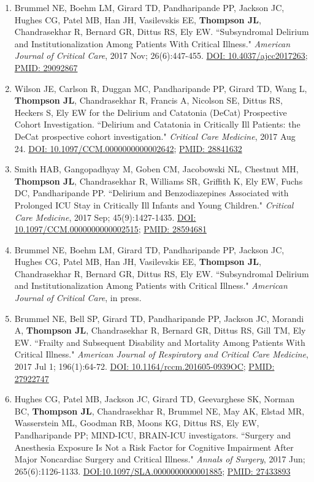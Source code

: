 \documentclass[5pt]{article}
\begin{document}
\begin{enumerate}
\item Brummel NE, Boehm LM, Girard TD, Pandharipande PP, Jackson JC, Hughes CG, Patel MB, Han JH, Vasilevskis EE, \textbf{Thompson JL}, Chandrasekhar R, Bernard GR, Dittus RS, Ely EW. ``Subsyndromal Delirium and Institutionalization Among Patients With Critical Illness." \emph{American Journal of Critical Care}, 2017 Nov; 26(6):447-455. \href{https://doi.org/10.4037/ajcc2017263}{DOI: 10.4037/ajcc2017263}; \href{https://www.ncbi.nlm.nih.gov/pubmed/29092867}{PMID: 29092867}
\item Wilson JE, Carlson R, Duggan MC, Pandharipande PP, Girard TD, Wang L, \textbf{Thompson JL}, Chandrasekhar R, Francis A, Nicolson SE, Dittus RS, Heckers S, Ely EW for the Delirium and Catatonia (DeCat) Prospective Cohort Investigation. ``Delirium and Catatonia in Critically Ill Patients: the DeCat prospective cohort investigation." \emph{Critical Care Medicine}, 2017 Aug 24. \href{https://insights.ovid.com/crossref?an=00003246-900000000-96519}{DOI: 10.1097/CCM.0000000000002642}; \href{https://www.ncbi.nlm.nih.gov/pubmed/28841632}{PMID: 28841632}
\item Smith HAB, Gangopadhyay M, Goben CM, Jacobowski NL, Chestnut MH, \textbf{Thompson JL}, Chandrasekhar R, Williams SR, Griffith K, Ely EW, Fuchs DC, Pandharipande PP. ``Delirium and Benzodiazepines Associated with Prolonged ICU Stay in Critically Ill Infants and Young Children." \emph{Critical Care Medicine}, 2017 Sep; 45(9):1427-1435. \href{https://insights.ovid.com/crossref?an=00003246-900000000-96586}{DOI: 10.1097/CCM.0000000000002515}; \href{https://www.ncbi.nlm.nih.gov/pubmed/28594681}{PMID: 28594681}
\item Brummel NE, Boehm LM, Girard TD, Pandharipande PP, Jackson JC, Hughes CG, Patel MB, Han JH, Vasilevskis EE, \textbf{Thompson JL}, Chandrasekhar R, Bernard GR, Dittus RS, Ely EW. ``Subsyndromal Delirium and Institutionalization Among Patients with Critical Illness." \emph{American Journal of Critical Care}, in press.
\item Brummel NE, Bell SP, Girard TD, Pandharipande PP, Jackson JC, Morandi A, \textbf{Thompson JL}, Chandrasekhar R, Bernard GR, Dittus RS, Gill TM, Ely EW. ``Frailty and Subsequent Disability and Mortality Among Patients With Critical Illness." \emph{American Journal of Respiratory and Critical Care Medicine}, 2017 Jul 1; 196(1):64-72. \href{https://doi.org/10.1164/rccm.201605-0939OC}{DOI: 10.1164/rccm.201605-0939OC}; \href{https://www.ncbi.nlm.nih.gov/pubmed/27922747}{PMID: 27922747}
\item Hughes CG, Patel MB, Jackson JC, Girard TD, Geevarghese SK, Norman BC, \textbf{Thompson JL}, Chandrasekhar R, Brummel NE, May AK, Elstad MR, Wasserstein ML, Goodman RB, Moons KG, Dittus RS, Ely EW, Pandharipande PP; MIND-ICU, BRAIN-ICU investigators. ``Surgery and Anesthesia Exposure Is Not a Risk Factor for Cognitive Impairment After Major Noncardiac Surgery and Critical Illness." \emph{Annals of Surgery}, 2017 Jun; 265(6):1126-1133. \href{https://doi.org/10.1097/SLA.0000000000001885}{DOI:10.1097/SLA.0000000000001885}; \href{https://www.ncbi.nlm.nih.gov/pubmed/27433893/}{PMID: 27433893}

\end{enumerate}
\end{document}
